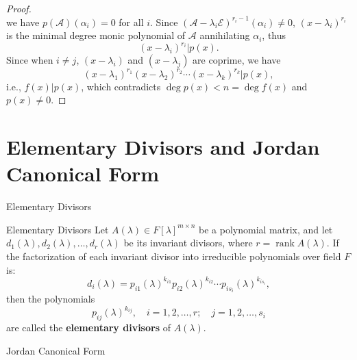 \documentclass[11pt]{../../TexTemplate/elegantbook} %
\begin{document}
\begin{proof}
\[\]
we have \(p(\mathcal{A})(\alpha_{i}) = 0\) for all \(i\).
\newline Since \((\mathcal{A} - \lambda_i \mathcal{E})^{r_i - 1}(\alpha_{i}) \neq 0\),
\((x - \lambda_i)^{r_i}\) is the minimal degree monic polynomial of \(\mathcal{A}\) annihilating \(\alpha_{i}\),
thus 
\[
(x - \lambda_i)^{r_i} | p(x).
\] 
Since when \(i\neq j\), \((x - \lambda_i)\) and \((x - \lambda_j)\) are coprime,
we have
\[
(x - \lambda_1)^{r_1} (x - \lambda_2)^{r_2} \cdots (x - \lambda_k)^{r_k} | p(x),
\]
i.e., \( f(x) | p(x) \),
which contradicts \(\operatorname{deg} p(x) <  n = \deg f(x)\) and \(p(x)\neq 0\).
\end{proof}


\section{Elementary Divisors and Jordan Canonical Form}
\begin{leftbarTitle}{Elementary Divisors}\end{leftbarTitle}
\begin{definition}{Elementary Divisors}
    Let \( A(\lambda) \in F[\lambda]^{m \times n} \) be a polynomial matrix,
    and let \( d_1(\lambda), d_2(\lambda), \dots, d_r(\lambda) \) be its invariant divisors,
    where \( r = \operatorname{rank} A(\lambda) \).
    If the factorization of each invariant divisor into irreducible polynomials over field \( F \) is:
    \[
    d_i(\lambda) = p_{i1}(\lambda)^{k_{i1}} p_{i2}(\lambda)^{k_{i2}} \cdots p_{is_i}(\lambda)^{k_{is_i}},
    \]
    then the polynomials
    \[
    p_{ij}(\lambda)^{k_{ij}}, \quad i = 1, 2, \dots, r; \quad j = 1, 2, \dots, s_i
    \]
    are called the \textbf{elementary divisors} of \( A(\lambda) \).
\end{definition}

\begin{leftbarTitle}{Jordan Canonical Form}\end{leftbarTitle}
\end{document}
